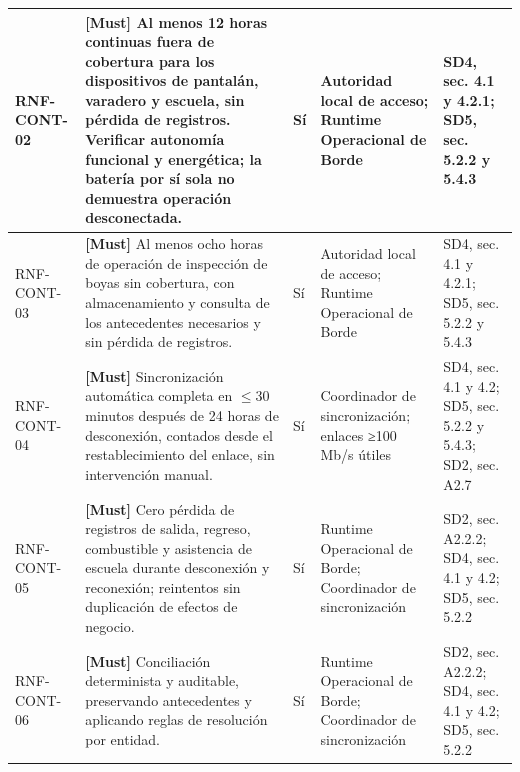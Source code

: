 \begin{paginaHorizontalSynaptix}
\begin{longtable}{|L{0.09\AnchoMatrizTDoce}|L{0.385\AnchoMatrizTDoce}|L{0.065\AnchoMatrizTDoce}|L{0.18\AnchoMatrizTDoce}|L{0.28\AnchoMatrizTDoce}|}
RNF-\allowbreak{}CONT-\allowbreak{}02 &
\textbf{[Must]} Al menos 12 horas continuas fuera de cobertura para los dispositivos de pantalán, varadero y escuela, sin pérdida de registros. Verificar autonomía funcional y energética; la batería por sí sola no demuestra operación desconectada. &
Sí &
Autoridad local de acceso; Runtime Operacional de Borde &
SD4, sec. 4.1 y 4.2.1; SD5, sec. 5.2.2 y 5.4.3 \\ \hline

RNF-\allowbreak{}CONT-\allowbreak{}03 &
\textbf{[Must]} Al menos ocho horas de operación de inspección de boyas sin cobertura, con almacenamiento y consulta de los antecedentes necesarios y sin pérdida de registros. &
Sí &
Autoridad local de acceso; Runtime Operacional de Borde &
SD4, sec. 4.1 y 4.2.1; SD5, sec. 5.2.2 y 5.4.3 \\ \hline

RNF-\allowbreak{}CONT-\allowbreak{}04 &
\textbf{[Must]} Sincronización automática completa en \(\leq\)30 minutos después de 24 horas de desconexión, contados desde el restablecimiento del enlace, sin intervención manual. &
Sí &
Coordinador de sincronización; enlaces ≥100 Mb/s útiles &
SD4, sec. 4.1 y 4.2; SD5, sec. 5.2.2 y 5.4.3; SD2, sec. A2.7 \\ \hline

RNF-\allowbreak{}CONT-\allowbreak{}05 &
\textbf{[Must]} Cero pérdida de registros de salida, regreso, combustible y asistencia de escuela durante desconexión y reconexión; reintentos sin duplicación de efectos de negocio. &
Sí &
Runtime Operacional de Borde; Coordinador de sincronización &
SD2, sec. A2.2.2; SD4, sec. 4.1 y 4.2; SD5, sec. 5.2.2 \\ \hline

RNF-\allowbreak{}CONT-\allowbreak{}06 &
\textbf{[Must]} Conciliación determinista y auditable, preservando antecedentes y aplicando reglas de resolución por entidad. &
Sí &
Runtime Operacional de Borde; Coordinador de sincronización &
SD2, sec. A2.2.2; SD4, sec. 4.1 y 4.2; SD5, sec. 5.2.2 \\ \hline
\end{longtable}



\end{paginaHorizontalSynaptix}
